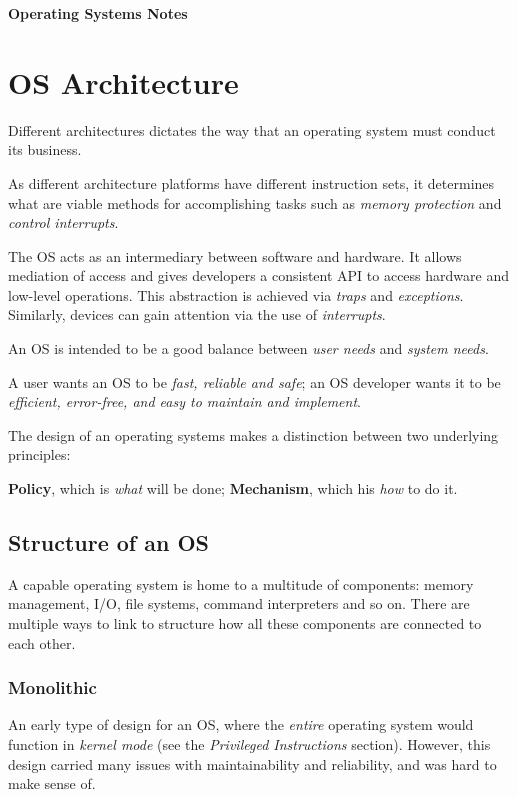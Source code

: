 \documentclass[a4]{article}
\begin{document}
\textbf{\Huge Operating Systems Notes}

\tableofcontents

\section{OS Architecture}

Different architectures dictates the way that an operating system must conduct its business.

As different architecture platforms have different instruction sets, it determines what are viable methods for accomplishing tasks such as \textit{memory protection} and \textit{control interrupts}.

The OS acts as an intermediary between software and hardware. It allows mediation of access and gives developers a consistent API to access hardware and low-level operations. This abstraction is achieved via \textit{traps} and \textit{exceptions}. Similarly, devices can gain attention via the use of \textit{interrupts}.

An OS is intended to be a good balance between \textit{user needs} and \textit{system needs}.

A user wants an OS to be \textit{fast, reliable and safe}; an OS developer wants it to be \textit{efficient, error-free, and easy to maintain and implement}.

The design of an operating systems makes a distinction between two underlying principles:

\textbf{Policy}, which is \textit{what} will be done; \textbf{Mechanism}, which his \textit{how} to do it.

\subsection{Structure of an OS}

A capable operating system is home to a multitude of components: memory management, I/O, file systems, command interpreters and so on. There are multiple ways to link to structure how all these components are connected to each other.

\subsubsection{Monolithic}

An early type of design for an OS, where the \textit{entire} operating system would function in \textit{kernel mode} (see the \textit{Privileged Instructions} section). However, this design carried many issues with maintainability and reliability, and was hard to make sense of.
\end{document}
